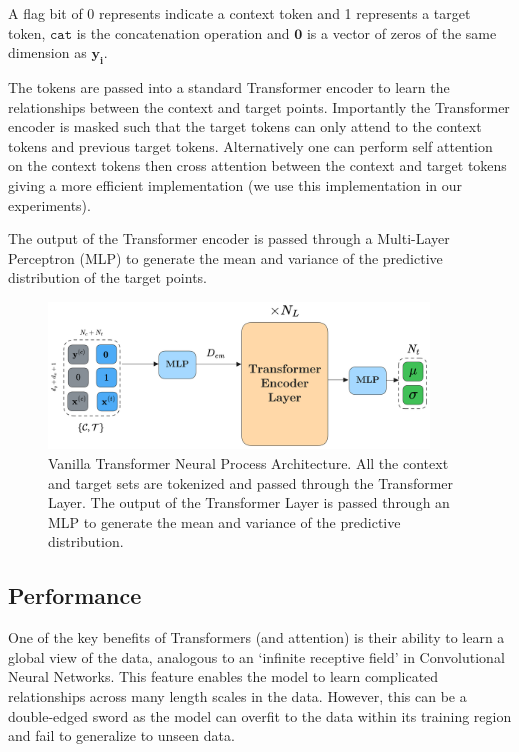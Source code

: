 \documentclass[../../main.tex]{subfiles}
\begin{document}
A flag bit of 0 represents indicate a context token and 1 represents a target token, $\texttt{cat}$ is the concatenation operation and $\bm{0}$ is a vector of zeros of the same dimension as $\bm{y_i}$.

The tokens are passed into a standard Transformer encoder to learn the relationships between the context and target points. Importantly the Transformer encoder is masked such that the target tokens can only attend to the context tokens and previous target tokens. Alternatively one can perform self attention on the context tokens then cross attention between the context and target tokens giving a more efficient implementation \parencite{feng2022efficient} (we use this implementation in our experiments).

The output of the Transformer encoder is passed through a Multi-Layer Perceptron (MLP) to generate the mean and variance of the predictive distribution of the target points. 


\begin{figure}[H]
	\centering
	\includegraphics[width=0.9\textwidth]{./tnp.png}
	\caption{Vanilla Transformer Neural Process Architecture. All the context and target sets are tokenized and passed through the Transformer Layer. The output of the Transformer Layer is passed through an MLP to generate the mean and variance of the predictive distribution.}
	\label{fig:tnp}
\end{figure}

\subsection{Performance}

One of the key benefits of Transformers (and attention) is their ability to learn a global view of the data, analogous to an `infinite receptive field' in Convolutional Neural Networks. This feature enables the model to learn complicated relationships across many length scales in the data. However, this can be a double-edged sword as the model can overfit to the data within its training region and fail to generalize to unseen data. 
\end{document}
